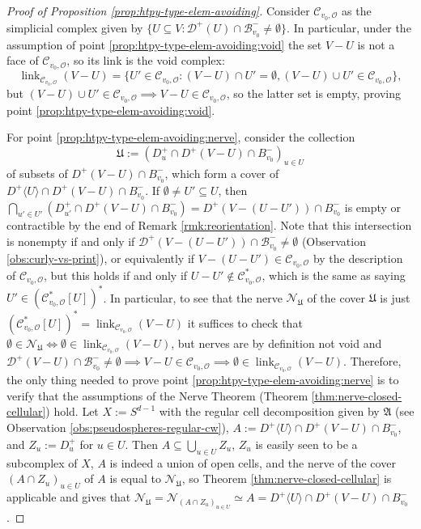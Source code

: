 \documentclass[a4paper,11pt,reqno, english]{amsart}
\theoremstyle{definition}
\theoremstyle{remark}
\DeclareMathOperator{\link}{\mathrm{link}}
\begin{document}
\begin{proof}[Proof of Proposition \ref{prop:htpy-type-elem-avoiding}]
    Consider $\mathscr{C}_{v_0,\mathscr{O}}$ as the simplicial complex given by $\{U\subseteq V:\mathscr{D}^+(U)\cap\mathscr{B}^-_{v_0}\neq\emptyset\}$. In particular, under the assumption of point \ref{prop:htpy-type-elem-avoiding:void} the set $V-U$ is not a face of $\mathscr{C}_{v_0,\mathscr{O}}$, so its link is the void complex:
    \[
        \link_{\mathscr{C}_{v_0,\mathscr{O}}}(V-U)=\{U'\in\mathscr{C}_{v_0,\mathscr{O}}:(V-U)\cap U'=\emptyset,(V-U)\cup U'\in\mathscr{C}_{v_0,\mathscr{O}}\},
    \]
    but $(V-U)\cup U'\in\mathscr{C}_{v_0,\mathscr{O}}\implies V-U\in\mathscr{C}_{v_0,\mathscr{O}}$, so the latter set is empty, proving point \ref{prop:htpy-type-elem-avoiding:void}.

    For point \ref{prop:htpy-type-elem-avoiding:nerve}, consider the collection
    \[
        \mathfrak{U}:=(D^+_u\cap D^+(V-U)\cap B^-_{v_0})_{u\in U}
    \]
    of subsets of $D^+(V-U)\cap B^-_{v_0}$, which form a cover of $D^+\langle U\rangle\cap D^+(V-U)\cap B^-_{v_0}$. If $\emptyset\neq U'\subseteq U$, then $\bigcap_{u'\in U'}(D^+_{u'}\cap D^+(V-U)\cap B^-_{v_0})=D^+(V-(U-U'))\cap B^-_{v_0}$ is empty or contractible by the end of Remark \ref{rmk:reorientation}. Note that this intersection is nonempty if and only if $\mathscr{D}^+(V-(U-U'))\cap\mathscr{B}^-_{v_0}\neq\emptyset$ (Observation \ref{obs:curly-vs-print}), or equivalently if $V-(U-U')\in\mathscr{C}_{v_0,\mathscr{O}}$ by the description of $\mathscr{C}_{v_0,\mathscr{O}}$, but this holds if and only if $U-U'\notin\mathscr{C}_{v_0,\mathscr{O}}^*$, which is the same as saying $U'\in(\mathscr{C}_{v_0,\mathscr{O}}^*[U])^*$. In particular, to see that the nerve $\mathscr{N}_{\mathfrak{U}}$ of the cover $\mathfrak{U}$ is just $(\mathscr{C}_{v_0,\mathscr{O}}^*[U])^*=\link_{\mathscr{C}_{v_0,\mathscr{O}}}(V-U)$ it suffices to check that $\emptyset\in\mathscr{N}_\mathfrak{U}\iff\emptyset\in\link_{\mathscr{C}_{v_0,\mathscr{O}}}(V-U)$, but nerves are by definition not void and $\mathscr{D}^+(V-U)\cap\mathscr{B}^-_{v_0}\neq\emptyset\implies V-U\in\mathscr{C}_{v_0,\mathscr{O}}\implies\emptyset\in\link_{\mathscr{C}_{v_0,\mathscr{O}}}(V-U)$. Therefore, the only thing needed to prove point \ref{prop:htpy-type-elem-avoiding:nerve} is to verify that the assumptions of the Nerve Theorem (Theorem \ref{thm:nerve-closed-cellular}) hold. 
    Let $X:=S^{d-1}$ with the regular cell decomposition given by $\mathfrak{A}$ (see Observation \ref{obs:pseudospheres-regular-cw}), $A:=D^+\langle U\rangle\cap D^+(V-U)\cap B^-_{v_0}$, and $Z_u:=D^+_u$ for $u\in U$. Then $A\subseteq\bigcup_{u\in U}Z_u$, $Z_u$ is easily seen to be a subcomplex of $X$, $A$ is indeed a union of open cells, and the nerve of the cover $(A\cap Z_u)_{u\in U}$ of $A$ is equal to $\mathscr{N}_\mathfrak{U}$, so Theorem \ref{thm:nerve-closed-cellular} is applicable and gives that $\mathscr{N}_\mathfrak{U}=\mathscr{N}_{(A\cap Z_u)_{u\in U}}\simeq A=D^+\langle U\rangle\cap D^+(V-U)\cap B^-_{v_0}$.


\end{proof}
\end{document}
